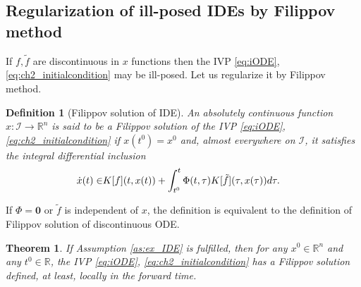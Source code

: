 \documentclass{article}
\newcommand{\R}{\mathbb{R}}
\newcommand{\zero}{\mathbf{0}}
\newtheorem{theorem}{Theorem}
\newtheorem{definition}{Definition}
\begin{document}
\subsection{Regularization of ill-posed IDEs by Filippov method}
If $f,\tilde f$ are  discontinuous in $x$ functions then the IVP \eqref{eq:iODE}, \eqref{eq:ch2_initialcondition}  may be ill-posed. Let us regularize it by Filippov method.
\begin{definition}[Filippov solution of IDE] \itshape
\quad An absolutely continuous function $x: \mathcal{I}\to \R^n$  is said to be a Filippov solution of the IVP  \eqref{eq:iODE}, \eqref{eq:ch2_initialcondition} if  $x(t^0)=x^0$ and, almost everywhere on $\mathcal{I}$, it satisfies  the integral differential inclusion\footnotemark\vspace{-1mm}
\begin{equation}\label{eq:Filippov_iODE}
	\begin{split}
\dot x(t)\in& K[f](t,x(t))+\int^t_{t^0} \Phi(t,\tau) K[\tilde f](\tau,x(\tau)) d\tau. \vspace{-1mm}
\end{split}
\end{equation}
\end{definition}
If  $\Phi=\zero$ or $\tilde f$ is independent of $x$, the definition is equivalent to the definition of Filippov solution of discontinuous ODE.
\begin{theorem}\label{thm:sol_iODE}\itshape
If Assumption \ref{as:ex_IDE} is fulfilled, then
for any $x^0\in \R^n$ and any $t^0\in \R$,  the IVP \eqref{eq:iODE}, \eqref{eq:ch2_initialcondition} has a Filippov solution defined, at least, locally in the forward time. 
\end{theorem}
\end{document}
